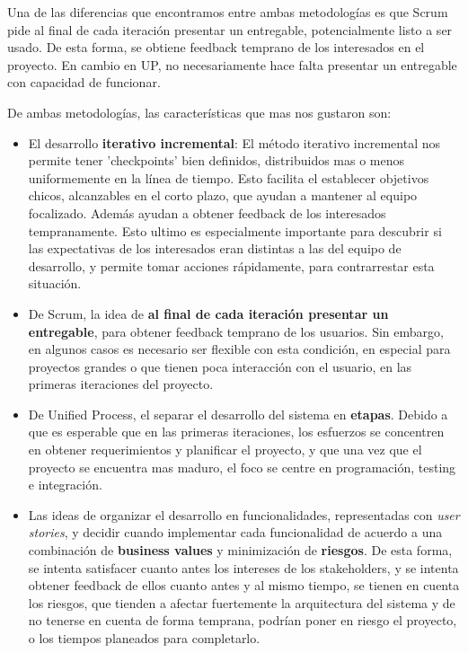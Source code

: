 	Una de las diferencias que encontramos entre ambas metodologías es que Scrum pide al final de cada iteración presentar un entregable, potencialmente listo a ser usado. De esta forma, se obtiene feedback temprano de los interesados en el proyecto. En cambio en UP, no necesariamente hace falta presentar un entregable con capacidad de funcionar.

	De ambas metodologías, las características que mas nos gustaron son:

	\begin{itemize}
		\item El desarrollo \textbf{iterativo incremental}: El método iterativo incremental nos permite tener 'checkpoints' bien definidos, distribuidos mas o menos uniformemente en la línea de tiempo. Esto facilita el establecer objetivos chicos, alcanzables en el corto plazo, que ayudan a mantener al equipo focalizado. Además ayudan a obtener feedback de los interesados tempranamente. Esto ultimo es especialmente importante para descubrir si las expectativas de los interesados eran distintas a las del equipo de desarrollo, y permite tomar acciones rápidamente, para contrarrestar esta situación.

		\item De Scrum, la idea de \textbf{al final de cada iteración presentar un entregable}, para obtener feedback temprano de los usuarios. Sin embargo, en algunos casos es necesario ser flexible con esta condición, en especial para proyectos grandes o que tienen poca interacción con el usuario, en las primeras iteraciones del proyecto.

		\item De Unified Process, el separar el desarrollo del sistema en \textbf{etapas}. Debido a que es esperable que en las primeras iteraciones, los esfuerzos se concentren en obtener requerimientos y planificar el proyecto, y que una vez que el proyecto se encuentra mas maduro, el foco se centre en programación, testing e integración.

		\item Las ideas de organizar el desarrollo en funcionalidades, representadas con \emph{user stories}, y decidir cuando implementar cada funcionalidad de acuerdo a una combinación de \textbf{business values} y minimización de \textbf{riesgos}. De esta forma, se intenta satisfacer cuanto antes los intereses de los stakeholders, y se intenta obtener feedback de ellos cuanto antes y al mismo tiempo, se tienen en cuenta los riesgos, que tienden a afectar fuertemente la arquitectura del sistema y de no tenerse en cuenta de forma temprana, podrían poner en riesgo el proyecto, o los tiempos planeados para completarlo.


\end{itemize}
